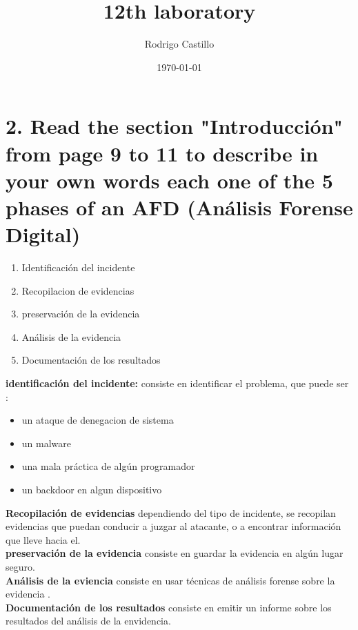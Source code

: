 \documentclass[10pt,a4paper]{article} %
\begin{document}
    \title{{  12th laboratory  }}
    \author{{Rodrigo Castillo}}
    \date{\today}

    \maketitle


    \section{2. Read the section "Introducción" from page 9 to 11 to describe
        in your own words each one of the 5 phases of an AFD (Análisis Forense
        Digital)}

        \begin{enumerate}
            \item {Identificación del incidente}
            \item {Recopilacion de evidencias}
            \item {preservación de la evidencia}
            \item {Análisis de la evidencia}
            \item {Documentación de los resultados}
        \end{enumerate}

        \textbf{identificación del incidente:}  consiste en identificar el problema, que puede ser : \begin{itemize}
                \item {un ataque de denegacion de sistema}
                \item {un malware}
                \item {una mala práctica de algún programador}
                \item {un backdoor en algun dispositivo}
        \end{itemize}

    \textbf{ Recopilación de evidencias} dependiendo del tipo de incidente, se
    recopilan evidencias que puedan conducir a juzgar al atacante, o a
    encontrar información que lleve hacia el.
    \\
    \textbf{preservación de la evidencia}  consiste en guardar la evidencia en
    algún lugar seguro.
    \\
    \textbf{Análisis de la eviencia} consiste en usar técnicas de análisis
    forense sobre la evidencia .
    \\
    \textbf{Documentación de los resultados} consiste en emitir un informe
    sobre los resultados del análisis de la envidencia.
\end{document}
